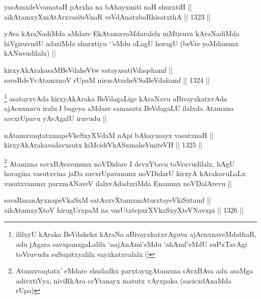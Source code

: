 \begin{shl}
yasAmxdeVvamataH pArxha na bAhayxmiti naH shurxtiH || \\
aikAtamxyXmAtArxvasiteVnaR veVdAnatxbaRhisatxthA ||  1323 ||  
\end{shl}

\begin{artha}
yAva kAraNadiMda aMdare EkAtamxvoMdaralelx niMtiruva kAraNadiMda hiVgiruvudU adariMda shurxtiyu `\stext'eMdu oLagU horagU (beVre yoMdanunx kANuvudilalx) ||
\end{artha}


\begin{shl}
kirxyAkArakasaMBeVdaheVtw satayxsatiVdaqshamf || \\
savaRdeYvA\s \s tamxnoV rUpaM nirasAtxsheVSaBeVdakamf ||  1324 ||  
\end{shl}

\begin{artha}
\footnote{ililxyU kAraka BeVdakekx kAraNa aBivayxkatxvAguva ajAcnxnaveMdathaR, adu jAgara savxpanxgaLalilx `najAnAmi'eMdu `ahAmf'eMdU suPxTavAgi toVruvudu suSupitxyalilx vayxkatxvalalx ||}
asatayxvAda kirxyAkAraka BeVdagaLige kAraNavu aBivayxkatxvAda ajAcnxnavu iralu I bageya aMdare samasatx BeVdagaLU ilalxda Atamxna savxrUpavu yAvAgalU iruvudu ||
\end{artha}

\begin{shl}
nA\s \s tamxvaqtatxmapeVkeSxyXVdaM nApi bAhayxsayx vasutxnaH || \\
kirxyAkArakavadavxsutx kiMcidiVkASxmaheV\s miteVH ||  1325 ||  
\end{shl}

\begin{artha}
\footnote{Atamxvaqtatx' eMdare shudadhx parxtayxgAtamxna sAvxBAva adu asaMga adivxtiVya, niviRkAra ceYtanayx matutx vAyxpaka (sacicxdAnaMda rUpa)}
Atamxna savxBAvavanunx noVDidare I devxYtavu toVruvudilalx, hAgU horagina vasutxvina jaDa savxrUpavanunx noVDidarU kirxyA kArakavuLaLx vasutxvanunx parxmANaveV ilalxvAdadxriMda Enanunx noVDalArevu ||
\end{artha}


\begin{shl}
savaRmanAyxnapeVkaSxM satAsxvXtamxmAtarxtayeVkiSxtamf || \\
aikAtamxyXtoV hirugUrxpaM na vasUtxtepxrXVkaSxyXteV\s Navxpi ||  1326 ||  
\end{shl}

